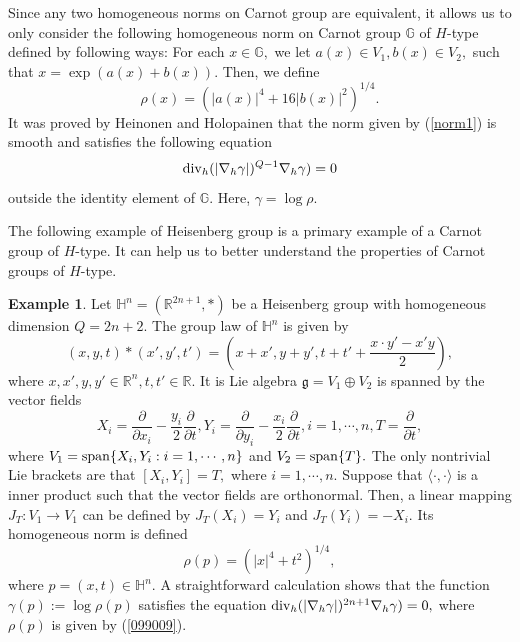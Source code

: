 \documentclass[11pt,twoside]{article}
\theoremstyle{definition}
\newtheorem{exmp}{Example}[section]
\theoremstyle{remark}
\begin{document}
 Since any two  homogeneous norms on  Carnot group are equivalent, it allows us to only consider the following homogeneous norm on  Carnot group $\mathbb{G}$ of $H$-type defined by following ways: For each $x\in \mathbb{G},$ we let $a(x)\in V_{1},b(x)\in V_{2},$ such that $x=\exp\left(a(x)+b(x)\right).$ Then, we define 
\begin{equation}\label{norm1}
\rho(x)=\left(\vert a(x)\vert^{4}+16\vert b(x)\vert^{2}\right)^{1/4}.
\end{equation}
It was proved by Heinonen and Holopainen \cite{HH97} that the norm given by (\ref{norm1}) is smooth and satisfies the following equation 
\begin{equation}
{\rm div}_{h}(\vert\nabla_{h}\gamma\vert)^{Q-1}\nabla_{h}\gamma)=0
\end{equation}
 outside the identity element of $\mathbb{G}.$ Here, $\gamma=\log\rho.$ 

The following example of Heisenberg group is a  primary example of a Carnot group of $H$-type. It can  help us to better understand the properties of Carnot groups of $H$-type.
\begin{exmp}\cite[Example 1.1]{BV23}
Let $\mathbb{H}^{n}=(\mathbb{R}^{2n+1},\ast)$ be a Heisenberg group with homogeneous dimension $Q=2n+2.$ The group law of  $\mathbb{H}^{n}$ is  given by
$$(x,y,t)\ast(x',y',t')=\left(x+x',y+y',t+t'+\frac{x\cdot y'-x'y}{2}\right),$$
where $x,x',y,y'\in \mathbb{R}^{n},t,t'\in\mathbb{R}.$ It is Lie algebra $\mathfrak{g}=V_{1}\oplus V_{2}$ is spanned by the vector fields
$$X_{i}=\frac{\partial}{\partial x_{i}}-\frac{y_{i}}{2}\frac{\partial}{\partial t},Y_{i}=\frac{\partial}{\partial y_{i}}-\frac{x_{i}}{2}\frac{\partial}{\partial t}, i=1,\cdots,n,T=\frac{\partial}{\partial t},$$
where $V_{1}={\rm span}\{X_{i},Y_{i}:i=1,\cdots,n\}$ and $V_{2}={\rm span}\{T\}.$ The only nontrivial Lie brackets are that $[X_{i},Y_{i}]=T,$ where $i=1,\cdots,n.$ Suppose that $\langle \cdot,\cdot\rangle$
is a inner product such that the vector fields are orthonormal. Then, a linear mapping $J_{T}:V_{1}\rightarrow V_{1}$ can be defined by $J_{T}(X_{i})=Y_{i}$ and $J_{T}(Y_{i})=-X_{i}.$ Its homogeneous norm is defined 
\begin{equation}\label{099009}
\rho(p)=\left(\vert x\vert^{4}+t^{2}\right)^{1/4},
\end{equation}
where $p=(x,t)\in \mathbb{H}^{n}.$ A straightforward calculation shows that the function $\gamma(p):=\log\rho(p)$  satisfies the equation 
${\rm div}_{h}(\vert\nabla_{h}\gamma\vert)^{2n+1}\nabla_{h}\gamma)=0,$
where $\rho(p)$ is given by (\ref{099009}).
\end{exmp}
\end{document}
